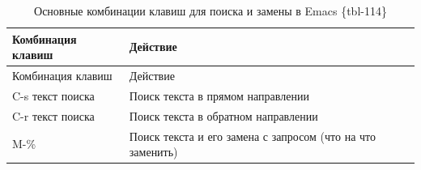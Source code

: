 \documentclass[
  english,
  russian,
  12pt,
  a4paper,
]{scrreprt}
\begin{document}
\begin{longtable}[]{@{}
  >{\raggedright\arraybackslash}p{}
  >{\raggedright\arraybackslash}p{}@{}}
\caption{Основные комбинации клавиш для поиска и замены в Emacs
\{tbl-114\}}\tabularnewline
\toprule\noalign{}
\begin{minipage}[b]{\linewidth}\raggedright
Комбинация клавиш
\end{minipage} & \begin{minipage}[b]{\linewidth}\raggedright
Действие
\end{minipage} \\
\midrule\noalign{}
\endfirsthead
\toprule\noalign{}
\begin{minipage}[b]{\linewidth}\raggedright
Комбинация клавиш
\end{minipage} & \begin{minipage}[b]{\linewidth}\raggedright
Действие
\end{minipage} \\
\midrule\noalign{}
\endhead
\bottomrule\noalign{}
\endlastfoot
C-s текст поиска & Поиск текста в прямом направлении \\
C-r текст поиска & Поиск текста в обратном направлении \\
M-\% & Поиск текста и его замена с запросом (что на что заменить) \\
\end{longtable}
\end{document}

